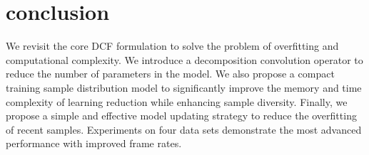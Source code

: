 \documentclass[a4paper,18pt]{article}
\begin{document}
\section{conclusion}
We revisit the core DCF formulation to solve the problem of overfitting and computational complexity. We introduce a decomposition convolution operator to reduce the number of parameters in the model. We also propose a compact training sample distribution model to significantly improve the memory and time complexity of learning reduction while enhancing sample diversity. Finally, we propose a simple and effective model updating strategy to reduce the overfitting of recent samples. Experiments on four data sets demonstrate the most advanced performance with improved frame rates.	
\small{
}
%  
%
 
   
\end{document}
